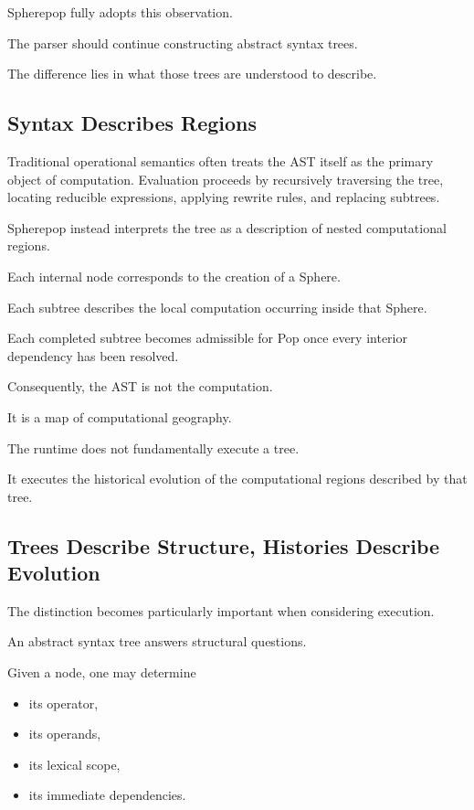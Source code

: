 \documentclass[12pt,oneside]{article}
\theoremstyle{definition}
\theoremstyle{remark}
\begin{document}
Spherepop fully adopts this observation.

The parser should continue constructing abstract syntax trees.

The difference lies in what those trees are understood to describe.

\subsection{Syntax Describes Regions}

Traditional operational semantics often treats the AST itself as the primary
object of computation. Evaluation proceeds by recursively traversing the tree,
locating reducible expressions, applying rewrite rules, and replacing
subtrees.

Spherepop instead interprets the tree as a description of nested
computational regions.

Each internal node corresponds to the creation of a Sphere.

Each subtree describes the local computation occurring inside that Sphere.

Each completed subtree becomes admissible for Pop once every interior
dependency has been resolved.

Consequently, the AST is not the computation.

It is a map of computational geography.

The runtime does not fundamentally execute a tree.

It executes the historical evolution of the computational regions described by
that tree.

\subsection{Trees Describe Structure, Histories Describe Evolution}

The distinction becomes particularly important when considering execution.

An abstract syntax tree answers structural questions.

Given a node, one may determine

\begin{itemize}
\item its operator,
\item its operands,
\item its lexical scope,
\item its immediate dependencies.
\end{itemize}
\end{document}
